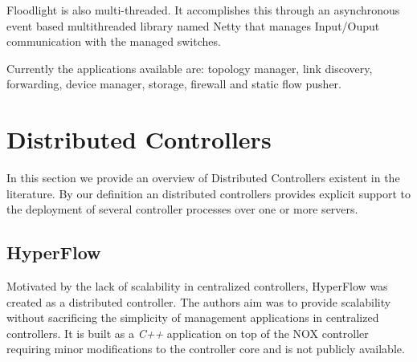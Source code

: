 Floodlight is also multi-threaded. It accomplishes this through an
asynchronous event based multithreaded library named Netty \cite{netty} that manages Input/Ouput communication with the managed
switches. 

Currently the applications available are: topology manager,  link
discovery, forwarding, device manager, storage, firewall and
static flow pusher.  


\section{Distributed Controllers}
\glsresetall
\label{sec:relatedWork:distributed}

In this section we provide an overview of Distributed Controllers
existent in the literature. By our definition an distributed
controllers provides explicit support to the deployment of several
controller processes over one or more servers. 

\subsection{HyperFlow}
Motivated by the lack of scalability in centralized controllers, HyperFlow \cite{Tootoonchian:2010vy} 
was created as a distributed controller. The 
authors aim was to provide scalability without sacrificing
the simplicity of management applications  in  centralized controllers. It
is built as a \emph{C++} application on top of the NOX 
controller \cite{Gude:2008jd} requiring minor modifications to the
controller core and is not publicly available. 

